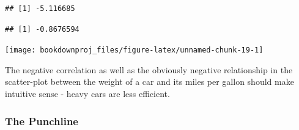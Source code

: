 \documentclass[
]{book}
\newenvironment{Shaded}{\begin{snugshade}}{\end{snugshade}}
\newcommand{\AttributeTok}[1]{\textcolor[rgb]{0.77,0.63,0.00}{#1}}
\newcommand{\CommentTok}[1]{\textcolor[rgb]{0.56,0.35,0.01}{\textit{#1}}}
\newcommand{\DecValTok}[1]{\textcolor[rgb]{0.00,0.00,0.81}{#1}}
\newcommand{\FunctionTok}[1]{\textcolor[rgb]{0.00,0.00,0.00}{#1}}
\newcommand{\NormalTok}[1]{#1}
\newcommand{\SpecialCharTok}[1]{\textcolor[rgb]{0.00,0.00,0.00}{#1}}
\newcommand{\StringTok}[1]{\textcolor[rgb]{0.31,0.60,0.02}{#1}}
\begin{document}
\begin{Shaded}
\end{Shaded}

\begin{verbatim}
## [1] -5.116685
\end{verbatim}

\begin{Shaded}
\end{Shaded}

\begin{verbatim}
## [1] -0.8676594
\end{verbatim}

\begin{Shaded}
\end{Shaded}

\begin{center}\texttt{[image: bookdownproj\_files/figure-latex/unnamed-chunk-19-1]} \end{center}

The negative correlation as well as the obviously negative relationship in the scatter-plot between the weight of a car and its miles per gallon should make intuitive sense - heavy cars are less efficient.

\hypertarget{the-punchline}{%
\subsubsection*{The Punchline}\label{the-punchline}}
\end{document}
